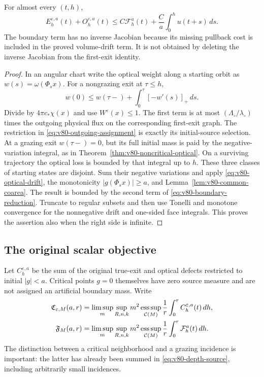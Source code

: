\begin{theorem}
\label{thm:v80-boundary-reduction}
For almost every $(t,h)$,
\begin{equation}\label{eq:v80-boundary-reduction}
 E_h^{\varepsilon,a}(t)+O_h^{\varepsilon,a}(t)
       \le C\mathcal F_h^a(t)+\frac C a\int_0^h u(t+s)\,ds.
\end{equation}
The boundary term has no inverse Jacobian because its missing
pullback cost is included in the proved volume-drift term. It is
not obtained by deleting the inverse Jacobian from the first-exit
identity.
\end{theorem}
\begin{proof}
In an angular chart write the optical weight along a starting orbit
as $w(s)=\omega(\Phi_sx)$. For a nongrazing exit at $\tau\le h$,
\[
 w(0)\le w(\tau-)+\int_0^\tau[-w'(s)]_+\,ds.
\]
Divide by $4\pi c_*\chi(x)$ and use $W^\varepsilon(x)\le1$.
The first term is at most
$(\Lambda_\circ/\lambda_\circ)$ times the outgoing physical flux
on the corresponding first-exit graph. The restriction in
\eqref{eq:v80-outgoing-assignment} is exactly its initial-source
selection. At a grazing exit $w(\tau-)=0$, but its full initial
mass is paid by the negative-variation integral, as in
Theorem~\ref{thm:v80-noncritical-optical}. On a surviving trajectory
the optical loss is bounded by that integral up to $h$.
These three classes of starting states are disjoint. Sum their
negative variations and apply \eqref{eq:v80-optical-drift}, the
monotonicity $|g(\Phi_sx)|\ge a$, and
Lemma~\ref{lem:v80-common-coarea}. The result is bounded by the
second term of \eqref{eq:v80-boundary-reduction}. Truncate to regular
subsets and then use Tonelli and monotone convergence for the
nonnegative drift and one-sided face integrals. This proves the
assertion also when the right side is infinite.
\end{proof}

\subsection{The original scalar objective}
Let $C_h^{\varepsilon,a}$ be the sum of the original true-exit and
optical defects restricted to initial $|g|<a$. Critical points
$g=0$ themselves have zero source measure and are not assigned an
artificial boundary mass. Write
\begin{align*}
 \mathfrak C_{\varepsilon,M}(a,r)
   &=\limsup_m\sup_{R,n,k}m^2\operatorname*{ess\,sup}_{\mathcal C(M)}
          \frac1r\int_0^r C_h^{\varepsilon,a}(t)\,dh,\\
 \mathfrak F_M(a,r)
   &=\limsup_m\sup_{R,n,k}m^2\operatorname*{ess\,sup}_{\mathcal C(M)}
          \frac1r\int_0^r \mathcal F_h^a(t)\,dh.
\end{align*}
The distinction between a critical neighborhood and a grazing
incidence is important: the latter has already been summed in
\eqref{eq:v80-depth-source}, including arbitrarily small incidences.

